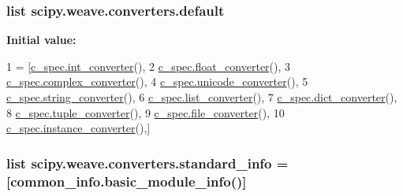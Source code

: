 \subsubsection[{default}]{\setlength{\rightskip}{0pt plus 5cm}list scipy.\+weave.\+converters.\+default}\label{namespacescipy_1_1weave_1_1converters_a01f7fe9329af114daf9c47df0fdebe04}
{\bfseries Initial value\+:}
\begin{DoxyCode}
1 = [\hyperlink{classscipy_1_1weave_1_1c__spec_1_1int__converter}{c\_spec.int\_converter}(),
2            \hyperlink{classscipy_1_1weave_1_1c__spec_1_1float__converter}{c\_spec.float\_converter}(),
3            \hyperlink{classscipy_1_1weave_1_1c__spec_1_1complex__converter}{c\_spec.complex\_converter}(),
4            \hyperlink{classscipy_1_1weave_1_1c__spec_1_1unicode__converter}{c\_spec.unicode\_converter}(),
5            \hyperlink{classscipy_1_1weave_1_1c__spec_1_1string__converter}{c\_spec.string\_converter}(),
6            \hyperlink{classscipy_1_1weave_1_1c__spec_1_1list__converter}{c\_spec.list\_converter}(),
7            \hyperlink{classscipy_1_1weave_1_1c__spec_1_1dict__converter}{c\_spec.dict\_converter}(),
8            \hyperlink{classscipy_1_1weave_1_1c__spec_1_1tuple__converter}{c\_spec.tuple\_converter}(),
9            \hyperlink{classscipy_1_1weave_1_1c__spec_1_1file__converter}{c\_spec.file\_converter}(),
10            \hyperlink{classscipy_1_1weave_1_1c__spec_1_1instance__converter}{c\_spec.instance\_converter}(),]
\end{DoxyCode}
\hypertarget{namespacescipy_1_1weave_1_1converters_a2daaef8f4b4ac7524227803d3a6179f7}{}
\subsubsection[{standard\+\_\+info}]{\setlength{\rightskip}{0pt plus 5cm}list scipy.\+weave.\+converters.\+standard\+\_\+info = \mbox{[}{\bf common\+\_\+info.\+basic\+\_\+module\+\_\+info}()\mbox{]}}\label{namespacescipy_1_1weave_1_1converters_a2daaef8f4b4ac7524227803d3a6179f7}

